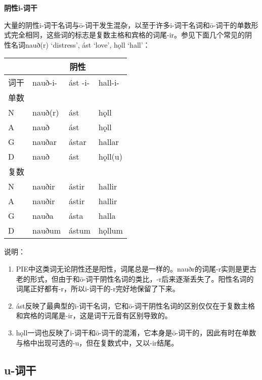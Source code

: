 \textbf{阴性i-词干}

大量的阴性i-词干名词与ō-词干发生混杂，以至于许多i-词干名词和ō-词干的单数形式完全相同，这些词的标志是复数主格和宾格的词尾-ir。参见下面几个常见的阴性名词nauð(r)
`distress', ást `love', hǫll `hall'：

\begin{longtable}{llll}
  \toprule
       & \multicolumn{3}{c}{阴性}                     \\
  \midrule
  \endhead
  \bottomrule
  \endfoot
  词干 & nauð-i-                  & ást -i- & hall-i- \\
  单数 &                          &         &         \\
  N    & nauð(r)                  & ást     & hǫll    \\
  A    & nauð                     & ást     & hǫll    \\
  G    & nauðar                   & ástar   & hallar  \\
  D    & nauð                     & ást     & hǫll(u) \\
  复数 &                          &         &         \\
  N    & nauðir                   & ástir   & hallir  \\
  A    & nauðir                   & ástir   & hallir  \\
  G    & nauða                    & ásta    & halla   \\
  D    & nauðum                   & ástum   & hǫllum  \\
\end{longtable}

说明：

\begin{enumerate}
  \def\labelenumi{\arabic{enumi})}
  \item
        PIE中这类词无论阴性还是阳性，词尾总是一样的。nauðr的词尾-r实则是更古老的形式，但由于和ō-词干阴性名词的类比，-r后来逐渐丢失了。阳性名词的词尾正好都有-r，所以i-词干的-r完好地保留了下来。
  \item
        ást反映了最典型的i-词干名词，它和ō-词干阴性名词的区别仅仅在于复数主格和宾格的词尾是-ir，这是词干元音有区别导致的。
  \item
        hǫll一词也反映了i-词干和ō-词干的混淆，它本身是ō-词干的，因此有时在单数与格中出现可选的-u，但在复数式中，又以-ir结尾。
\end{enumerate}

\subsection{u-词干}\label{u-词干}

